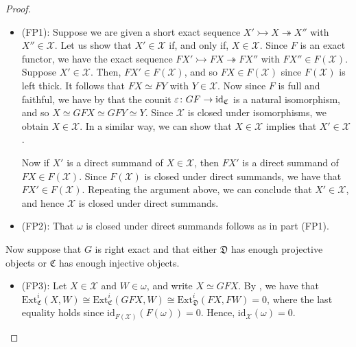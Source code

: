 \documentclass[10pt,reqno]{amsart}
\numberwithin{equation}{section}
\theoremstyle{remark}
\newcommand{\Ext}{\mathrm{Ext}}
\newcommand{\C}{\mathfrak{C}}
\newcommand{\X}{\mathcal{X}}
\newcommand{\id}{\mathrm{id}}
\begin{document}
\begin{proof} ~\
\begin{itemize}
\item {\sf (FP1)}: Suppose we are given a short exact sequence $X' \rightarrowtail X \twoheadrightarrow X''$ with $X'' \in \X$. Let us show that $X' \in \X$ if, and only if, $X \in \X$. Since $F$ is an exact functor, we have the exact sequence $FX' \rightarrowtail FX \twoheadrightarrow FX''$ with $FX'' \in F(\X)$. Suppose $X' \in \X$. Then, $FX' \in F(\X)$, and so $FX \in F(\X)$ since $F(\X)$ is left thick. It follows that $FX \simeq FY$ with $Y \in \X$. Now since $F$ is full and faithful, we have by \cite[Prop. 3.4.1]{BorceuxI} that the counit $\varepsilon \colon GF \to {\rm id}_{\C}$ is a natural isomorphism, and so $X \simeq GFX \simeq GFY \simeq Y$. Since $\X$ is closed under isomorphisms, we obtain $X \in \X$. In a similar way, we can show that $X \in \X$ implies that $X' \in \X$. 

Now if $X'$ is a direct summand of $X \in \X$, then $FX'$ is a direct summand of $FX \in F(\X)$. Since $F(\X)$ is closed under direct summands, we have that $FX' \in F(\X)$. Repeating the argument above, we can conclude that $X' \in \X$, and hence $\X$ is closed under direct summands. 

\item {\sf (FP2)}: That $\omega$ is closed under direct summands follows as in part {\sf (FP1)}. 
\end{itemize}
Now suppose that $G$ is right exact and that either $\mathfrak{D}$ has enough projective objects or $\C$ has enough injective objects. 
\begin{itemize}
\item {\sf (FP3)}: Let $X \in \X$ and $W \in \omega$, and write $X \simeq GFX$. By \cite[Coroll. 1]{AdamsRieffel}, we have that $\Ext^i_{\C}(X,W) \cong \Ext^i_{\C}(GFX,W) \cong \Ext^i_{\mathfrak{D}}(FX,FW) = 0$, where the last equality holds since $\id_{F(\X)}(F(\omega)) = 0$. Hence, $\id_{\X}(\omega) = 0$.


\end{itemize}
\end{proof}
\end{document}
